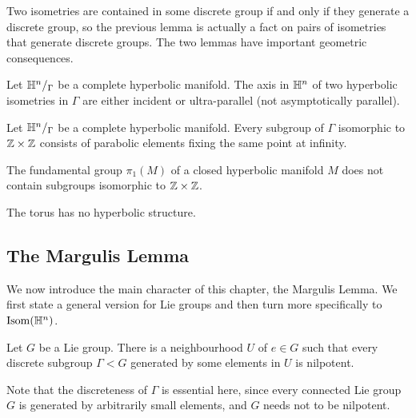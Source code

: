 Two isometries are contained in some discrete group if and only if they generate a discrete group, so the previous lemma is actually a fact on pairs of isometries that generate discrete groups.
The two lemmas have important geometric consequences.

\begin{cor}  \label{axis:cor}
Let $\mathbb{H}^n/_\Gamma$ be a complete hyperbolic manifold. The axis in $\mathbb{H}^n$ of two hyperbolic isometries in $\Gamma$ are either incident or ultra-parallel (not asymptotically parallel). 
\end{cor}

\begin{cor} \label{ZxZ:cor}
Let $\mathbb{H}^n/_\Gamma$ be a complete hyperbolic manifold. Every subgroup of $\Gamma$ isomorphic to $\mathbb{Z}\times\mathbb{Z}$ consists of parabolic elements fixing the same point at infinity.
\end{cor}

\begin{cor} \label{no:ZxZ:cor}
The fundamental group $\pi_1(M)$ of a closed hyperbolic manifold $M$ does not contain subgroups isomorphic to $\mathbb{Z}\times \mathbb{Z}$.
\end{cor}

\begin{cor} \label{torus:no:hyperbolic:cor}
The torus has no hyperbolic structure.
\end{cor}

\subsection{The Margulis Lemma}
We now introduce the main character of this chapter, the Margulis Lemma. We first state a general version for Lie groups and then turn more specifically to ${\rm Isom}(\mathbb{H}^n)$.

\begin{lemma} \label{G:lemma}
Let $G$ be a Lie group. There is a neighbourhood $U$ of $e\in G$ such that every discrete subgroup $\Gamma < G$ generated by some elements in $U$ is nilpotent.
\end{lemma}
Note that the discreteness of $\Gamma$ is essential here, since every connected Lie group $G$ is generated by arbitrarily small elements, and $G$ needs not to be nilpotent.

